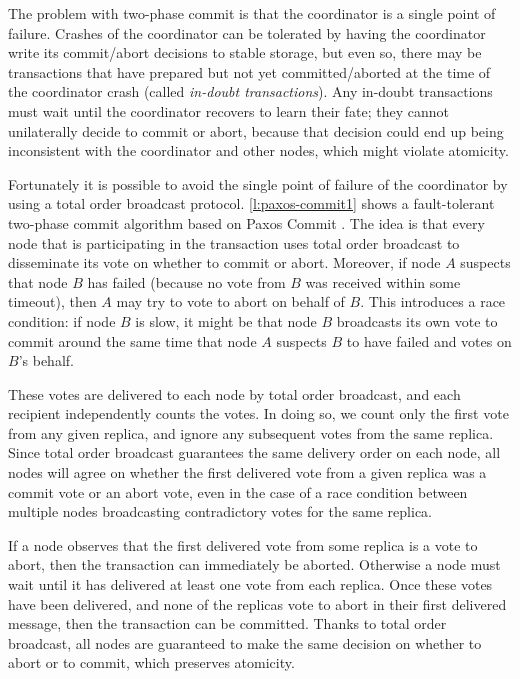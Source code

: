 The problem with two-phase commit is that the coordinator is a single point of failure.
Crashes of the coordinator can be tolerated by having the coordinator write its commit/abort decisions to stable storage, but even so, there may be transactions that have prepared but not yet committed/aborted at the time of the coordinator crash (called \emph{in-doubt transactions}).
Any in-doubt transactions must wait until the coordinator recovers to learn their fate; they cannot unilaterally decide to commit or abort, because that decision could end up being inconsistent with the coordinator and other nodes, which might violate atomicity.

Fortunately it is possible to avoid the single point of failure of the coordinator by using a total order broadcast protocol.
\autoref{l:paxos-commit1} shows a fault-tolerant two-phase commit algorithm based on Paxos Commit \citep{Gray:2006}.
The idea is that every node that is participating in the transaction uses total order broadcast to disseminate its vote on whether to commit or abort.
Moreover, if node $A$ suspects that node $B$ has failed (because no vote from $B$ was received within some timeout), then $A$ may try to vote to abort on behalf of $B$.
This introduces a race condition: if node $B$ is slow, it might be that node $B$ broadcasts its own vote to commit around the same time that node $A$ suspects $B$ to have failed and votes on $B$'s behalf.

These votes are delivered to each node by total order broadcast, and each recipient independently counts the votes.
In doing so, we count only the first vote from any given replica, and ignore any subsequent votes from the same replica.
Since total order broadcast guarantees the same delivery order on each node, all nodes will agree on whether the first delivered vote from a given replica was a commit vote or an abort vote, even in the case of a race condition between multiple nodes broadcasting contradictory votes for the same replica.

If a node observes that the first delivered vote from some replica is a vote to abort, then the transaction can immediately be aborted.
Otherwise a node must wait until it has delivered at least one vote from each replica.
Once these votes have been delivered, and none of the replicas vote to abort in their first delivered message, then the transaction can be committed.
Thanks to total order broadcast, all nodes are guaranteed to make the same decision on whether to abort or to commit, which preserves atomicity.

